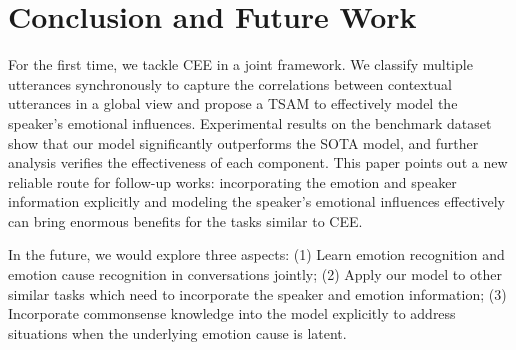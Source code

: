 \documentclass[11pt]{article}
\begin{document}
\section{Conclusion and Future Work}
For the first time, we tackle CEE in a joint framework. We classify multiple utterances synchronously to capture the correlations between contextual utterances in a global view and propose a TSAM to effectively model the speaker's emotional influences.
Experimental results on the benchmark dataset show that our model significantly outperforms the SOTA model, and further analysis verifies the effectiveness of each component. This paper points out a new reliable route for follow-up works: incorporating the emotion and speaker information explicitly and modeling the speaker's emotional influences effectively can bring enormous benefits for the tasks similar to CEE.

In the future, we would explore three aspects: (1) Learn emotion recognition and emotion cause recognition in conversations jointly; (2) Apply our model to other similar tasks which need to incorporate the speaker and emotion information; (3) Incorporate commonsense knowledge into the model explicitly to address situations when the underlying emotion cause is latent.



\end{document}
